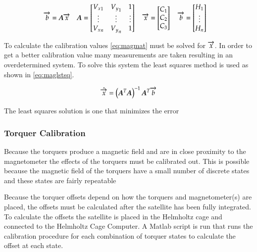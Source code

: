 \begin{equation}
    \overrightarrow{b}=\boldsymbol{A} \overrightarrow{x} \quad
    \boldsymbol{A} =
    \begin{bmatrix}
        {V_x}_1 & {V_y}_1 & 1 \\
        \vdots & \vdots & \vdots\\
        {V_x}_n & {V_y}_n & 1 \\
    \end{bmatrix} \quad
    \overrightarrow{x} = 
    \begin{bmatrix}
        C_1 \\
        C_2 \\
        C_3 \\
    \end{bmatrix} \quad
    \overrightarrow{b} = 
    \begin{bmatrix}
        H_1 \\
        \vdots \\
        H_n \\
    \end{bmatrix} \quad
    \label{eq:magmat}
\end{equation}

To calculate the calibration values \autoref{eq:magmat} must be solved for $\overrightarrow{x}$. In order to get a better calibration value many measurements are taken resulting in an overdetermined system. To solve this system the least squares method is used as shown in \autoref{eq:maglstsq}.

\begin{equation}
    \hat{\overrightarrow{x}} = \left(\boldsymbol{A} ^T \boldsymbol{A} \right) ^ {-1} \boldsymbol{A} ^T \overrightarrow{b}
    \label{eq:maglstsq}
\end{equation}

The least squares solution is one that minimizes the error 

\subsubsection{Torquer Calibration}

Because the torquers produce a magnetic field and are in close proximity to the magnetometer the effects of the torquers must be calibrated out. This is possible because the magnetic field of the torquers have a small number of discrete states and these states are fairly repeatable 

Because the torquer offsets depend on how the torquers and magnetometer(s) are placed, the offsets must be calculated after the satellite has been fully integrated. To calculate the offsets the satellite is placed in the Helmholtz cage and connected to the Helmholtz Cage Computer. A Matlab script is run that runs the calibration procedure for each combination of torquer states to calculate the offset at each state. 

